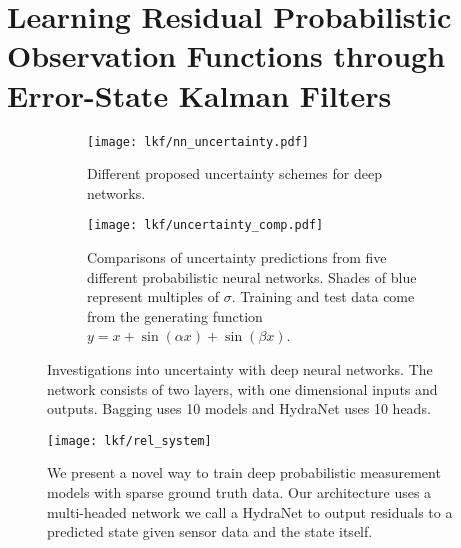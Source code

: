 \chapter{Learning Residual Probabilistic Observation Functions through Error-State Kalman Filters}

\begin{figure}[h!]
    \centering
    \begin{subfigure}[]{0.9\textwidth}
    \texttt{[image: lkf/nn\_uncertainty.pdf]}
    \caption{Different proposed uncertainty schemes for deep networks.}
    \label{fig:lkf_nn_uncertainty}    
    \end{subfigure}
    
    \begin{subfigure}[]{0.9\textwidth}
    \texttt{[image: lkf/uncertainty\_comp.pdf]}
    \caption{Comparisons of uncertainty predictions from five different probabilistic neural networks. Shades of blue represent multiples of $\sigma$. Training and test data come from the generating function $y = x + \sin{(\alpha x)} + \sin{(\beta x)}$.}
	\end{subfigure}
	\label{fig:lkf_deep-uncertainty}
	\caption{Investigations into uncertainty with deep neural networks. The network consists of two layers, with one dimensional inputs and outputs. Bagging uses 10 models and HydraNet uses 10 heads.}
\end{figure}

\begin{figure}
	\centering
	\texttt{[image: lkf/rel\_system]}
	\caption{We present a novel way to train deep probabilistic measurement models with sparse ground truth data. Our architecture uses a multi-headed network we call a HydraNet to output residuals to a predicted state given sensor data and the state itself.}
	\label{fig:lkf_system}
\end{figure}

 
